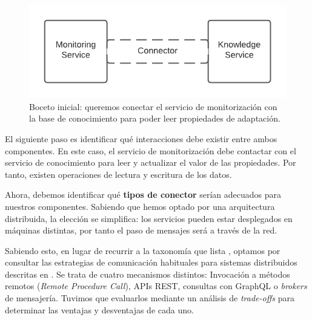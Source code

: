\begin{figure}[htb]
  \centering
  \includegraphics{03_arquitectura/images/Monitor-Knowledge-Initial-Connector}
  \caption{Boceto inicial: queremos conectar el servicio de monitorización con la base de conocimiento para poder leer propiedades de adaptación.}
  \label{fig:monitor-knowledge-initial}
\end{figure}

El siguiente paso es identificar qué interacciones debe existir entre ambos componentes. En este caso, el servicio de monitorización debe contactar con el servicio de conocimiento para leer y actualizar el valor de las propiedades. Por tanto, existen operaciones de lectura y escritura de los datos.

Ahora, debemos identificar qué \textbf{tipos de conector} serían adecuados para nuestros componentes. Sabiendo que hemos optado por una arquitectura distribuida, la elección se simplifica: los servicios pueden estar desplegados en máquinas distintas, por tanto el paso de mensajes será a través de la red.

Sabiendo esto, en lugar de recurrir a la taxonomía que lista \cite{mehtaTaxonomySoftwareConnectors2000}, optamos por consultar las estrategias de comunicación habituales para sistemas distribuidos descritas en \cite{newmanBuildingMicroservicesDesigning2021}. Se trata de cuatro mecanismos distintos: Invocación a métodos remotos (\emph{Remote Procedure Call}), APIs REST, consultas con GraphQL o \emph{brokers} de mensajería. Tuvimos que evaluarlos mediante un análisis de \emph{trade-offs} para determinar las ventajas y desventajas de cada uno.

